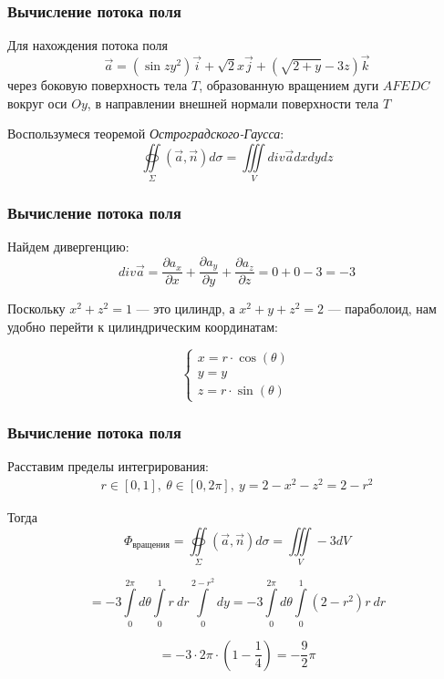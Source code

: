 \begin{frame}\frametitle{Вычисление потока поля}
  Для нахождения потока поля
  \begin{equation*}
		\vec a = (\sin zy^2) \vec i + \sqrt{2} x \vec j + (\sqrt{2+y} -3z) \vec k
	\end{equation*}
		      через боковую поверхность тела \(T\), образованную вращением дуги \(AFEDC\)
		      вокруг оси \(Oy\), в направлении внешней нормали поверхности тела \(T\)

  Воспользумеся теоремой \textit{Остроградского-Гаусса}:
  \begin{equation*}
    \oiint\limits_{\Sigma}\left( \vec {a}, \vec {n} \right) d\sigma = \iiint\limits_V div \vec {a} dxdydz 
  \end{equation*}
\end{frame}

\begin{frame}\frametitle{Вычисление потока поля}
  Найдем дивергенцию:
  \begin{equation*}
    div \vec a = \frac{\partial a_x}{\partial x} +  \frac{\partial a_y}{\partial y} +  \frac{\partial a_z}{\partial z} = 0 + 0 - 3 = -3 
	\end{equation*}

  Поскольку $x^2 + z^2 = 1$ — это цилиндр, а $x^2 + y + z^2 = 2$ — параболоид, нам удобно перейти к цилиндрическим координатам:

  \begin{equation*}
    \begin{cases}
      x = r \cdot \cos(\theta) \\
      y = y \\
      z = r \cdot \sin(\theta)
    \end{cases}
  \end{equation*}


\end{frame}

\begin{frame}\frametitle{Вычисление потока поля} 
  Расставим пределы интегрирования:
  \begin{align*}
    r \in [0, 1], \
    \theta \in [0, 2\pi], \ 
    y = 2 - x^2 - z^2 = 2 - r^2
  \end{align*}

  Тогда
  \begin{equation*}
    \Phi_{\text{вращения}} = \oiint\limits_{\Sigma}\left( \vec {a}, \vec {n} \right) d\sigma = \iiint\limits_V -3 dV
  \end{equation*}
  
  \begin{equation*}
    = -3 \int\limits_{0}^{2 \pi} d \theta
    \int\limits_{0}^{1} r~dr 
    \int\limits_{0}^{2-r^2} dy 
    = -3 \int\limits_{0}^{2 \pi} d \theta
    \int\limits_{0}^{1} (2-r^2)r~dr 
  \end{equation*}
 
  \begin{equation*}
    = -3 \cdot 2 \pi \cdot
    (1 - \frac{1}{4})
    = - \frac{9}{2}\pi
  \end{equation*}

\end{frame}

